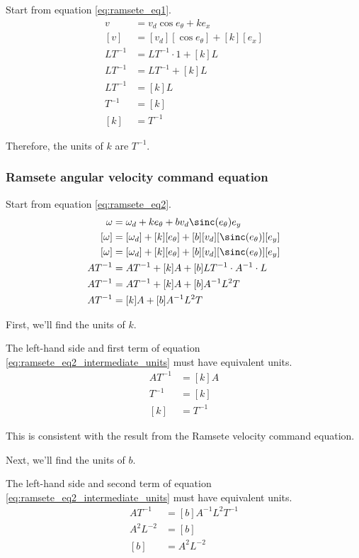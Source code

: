 Start from equation \eqref{eq:ramsete_eq1}.
\begin{align*}
  v &= v_d \cos e_\theta + k e_x \\
  [v] &= [v_d] [\cos e_\theta] + [k] [e_x] \\
  L T^{-1} &= L T^{-1} \cdot 1 + [k] L \\
  L T^{-1} &= L T^{-1} + [k] L \\
  L T^{-1} &= [k] L \\
  T^{-1} &= [k] \\
  [k] &= T^{-1}
\end{align*}

Therefore, the units of $k$ are $T^{-1}$.

\subsubsection{Ramsete angular velocity command equation}

Start from equation \eqref{eq:ramsete_eq2}.
\begin{align}
  \omega &= \omega_d + ke_\theta + bv_d \sinc(e_\theta) e_y \nonumber \\
  [\omega] &= [\omega_d] + [k][e_\theta] + [b][v_d] [\sinc(e_\theta)] [e_y]
    \nonumber \\
  [\omega] &= [\omega_d] + [k][e_\theta] + [b][v_d] [\sinc(e_\theta)] [e_y]
    \nonumber \\
  A T^{-1} &= A T^{-1} + [k] A + [b] L T^{-1} \cdot A^{-1} \cdot L \nonumber \\
  A T^{-1} &= A T^{-1} + [k] A + [b] A^{-1} L^{2} T \nonumber \\
  A T^{-1} &= [k] A + [b] A^{-1} L^{2} T
    \label{eq:ramsete_eq2_intermediate_units}
\end{align}

First, we'll find the units of $k$.

The left-hand side and first term of equation
\eqref{eq:ramsete_eq2_intermediate_units} must have equivalent units.
\begin{align*}
  A T^{-1} &= [k] A \\
  T^{-1} &= [k] \\
  [k] &= T^{-1}
\end{align*}

This is consistent with the result from the Ramsete velocity command equation.

Next, we'll find the units of $b$.

The left-hand side and second term of equation
\eqref{eq:ramsete_eq2_intermediate_units} must have equivalent units.
\begin{align*}
  A T^{-1} &= [b] A^{-1} L^{2} T^{-1} \\
  A^{2} L^{-2} &= [b] \\
  [b] &= A^{2} L^{-2}
\end{align*}

